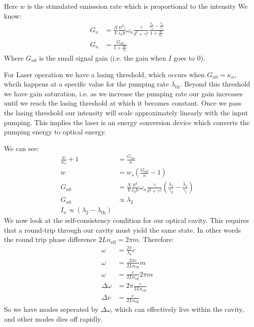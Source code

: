 Here $w$ is the stimulated emisssion rate which is proportional to the intensity We know:
\begin{align*}
	G_n &= \frac{N}{V} \frac{\mu^2|}{\epsilon_0\hbar}\omega_n \frac{\gamma}{\delta^2 + \gamma^2} \frac{\frac{\lambda_2}{\gamma_2} - \frac{\lambda_1}{\gamma_1}}{1 + \frac{w}{w_s}} \\
	G_n &= \frac{G_{n0}}{1 + \frac{w}{w_s}}
\end{align*}
Where $G_{n0}$ is the small signal gain (i.e. the gain when $I$ goes to 0).

For Laser operation we have a lasing threshold, which occurs when $G_{n0} = \kappa_n$, whcih happens at a specific value for the pumping rate $\lambda_\text{th}$.
Beyond this threshold we have gain saturation, i.e. as we increase the pumping rate our gain increases until we reach the lasing threshold at which it becomes constant.
Once we pass the lasing threshold our intensity will scale approximately linearly with the input pumping.
This implies the laser is an energy conversion device which converts the pumping energy to optical energy.

We can see:
\begin{align*}
	\frac{w}{w_s} + 1 &= \frac{G_{no}}{\kappa} \\
	w &= w_s \left(\frac{G_{n0}}{\kappa} -1\right) \\
	G_{n0} &= \frac{N}{V} \frac{\mu^2}{\epsilon_0 \hbar} \omega_n \frac{\gamma}{\delta^2 + \gamma^2} \left(\frac{\lambda_2}{\gamma_2}  - \frac{\lambda_1}{\gamma_1}\right) \\
	G_{n0} &\propto \lambda_2 \\
	I_n \propto (\lambda_2 - \lambda_\text{th})
\end{align*}
We now look at the self-consistency condition for our optical cavity. This requires that a round-trip through our cavity must yield the same state. In other words the round trip phase difference $2Ln_\text{eff} = 2\pi m$. Therefore:
\begin{align*}
	\omega &= \frac{2\pi}{\lambda_0} c \\
	\omega &= \frac{2\pi c }{2L n_\text{eff}} m \\
	\omega &= \frac{c}{2L n_\text{eff}} 2\pi m \\
	\Delta\omega &= 2\pi \frac{c}{2Ln_\text{eff}} \\
	\Delta \nu &= \frac{c}{2Ln_\text{eff}}
\end{align*}
So we have modes seperated by $\Delta\omega$, which can effectively live within the cavity, and other modes dies off rapidly.
